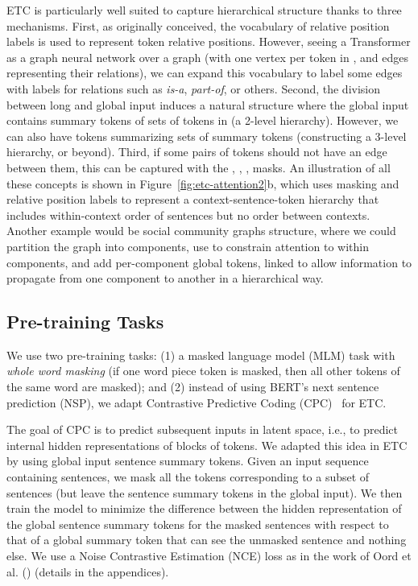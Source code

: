 \documentclass[11pt,a4paper]{article}
\begin{document}
ETC is particularly well suited to capture hierarchical structure thanks to three mechanisms. First, as originally conceived, the vocabulary of relative position labels is used to represent token relative positions. However, seeing a Transformer as a graph neural network over a graph  (with one vertex per token in , and edges representing their relations), we can expand this vocabulary to label some edges with labels for relations such as {\em is-a}, {\em part-of}, or others. Second, the division between long and global input induces a natural structure where the global input contains summary tokens of sets of tokens in  (a 2-level hierarchy). However, we can also have tokens summarizing sets of summary tokens (constructing a 3-level hierarchy, or beyond). Third, if some pairs of tokens should not have an edge between them, this can be captured with the , , ,  masks. An illustration of all these concepts is shown in Figure~\ref{fig:etc-attention2}b, which uses masking and relative position labels to represent a context-sentence-token hierarchy that includes within-context order of sentences but no order between contexts. 
Another example would be social community graphs structure, where we could partition the graph into components, use  to constrain attention to within components, and add per-component global tokens, linked to allow information to propagate from one component to another in a hierarchical way.







\subsection{Pre-training Tasks}

We use two pre-training tasks: (1) a masked language model (MLM) task with {\em whole word masking} (if one word piece token is masked, then all other tokens of the same word are masked); and (2) instead of using BERT's next sentence prediction (NSP), we adapt Contrastive Predictive Coding (CPC)~\cite{oord2018representation} for ETC. 

The goal of CPC is to predict subsequent inputs in latent space, i.e., to predict internal hidden representations of blocks of tokens. We adapted this idea in ETC by using global input sentence summary tokens. Given an input sequence containing  sentences, we mask all the tokens corresponding to a subset of sentences (but leave the sentence summary tokens in the global input). We then train the model to minimize the difference between the hidden representation of the global sentence summary tokens for the masked sentences with respect to that of a global summary token that can see the unmasked sentence and nothing else. We use a Noise Contrastive Estimation (NCE) loss as in the work of Oord et al. (\citeyear{oord2018representation}) (details in the appendices). 
\end{document}
